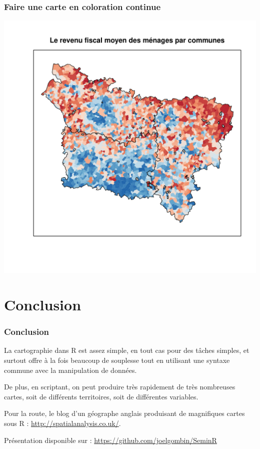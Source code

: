 \documentclass[slidetop, 10pt]{beamer}\usepackage{graphicx, color}
\newenvironment{knitrout}{}{} %
\renewenvironment{knitrout}{\begin{tiny}}{\end{tiny}}
\begin{document}
\begin{frame}
\frametitle{Faire une carte en coloration continue}
\begin{knitrout}\tiny
{}\color{fgcolor}

{\centering \includegraphics[width=.8\textwidth]{images/coloration} 

}


\end{knitrout}


\end{frame}
\section*{Conclusion}
\begin{frame}
\frametitle{Conclusion}

La cartographie dans R est assez simple, en tout cas pour des tâches simples, et surtout offre à la fois beaucoup de souplesse tout en utilisant une syntaxe commune avec la manipulation de données. 

De plus, en scriptant, on peut produire très rapidement de très nombreuses cartes, soit de différents territoires, soit de différentes variables.


Pour la route, le blog d'un géographe anglais produisant de magnifiques cartes sous R : \url{http://spatialanalysis.co.uk/}.


Présentation disponible sur : \url{https://github.com/joelgombin/SeminR}

\end{frame}
\end{document}
